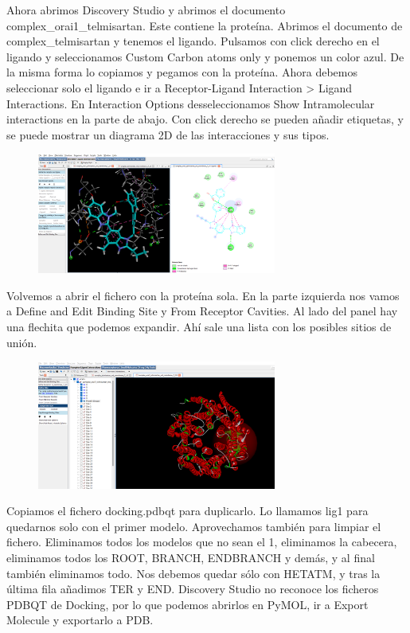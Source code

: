 Ahora abrimos Discovery Studio y abrimos el documento complex\_orai1\_telmisartan. Este contiene la proteína. Abrimos el documento de complex\_telmisartan y tenemos el ligando. Pulsamos con click derecho en el ligando y seleccionamos Custom Carbon atoms only y ponemos un color azul. De la misma forma lo copiamos y pegamos con la proteína. Ahora debemos seleccionar solo el ligando e ir a Receptor-Ligand Interaction > Ligand Interactions. En Interaction Options desseleccionamos Show Intramolecular interactions en la parte de abajo. Con click derecho se pueden añadir etiquetas, y se puede mostrar un diagrama 2D de las interacciones y sus tipos.

\begin{figure}[h]
\centering
\includegraphics[width = 0.7\textwidth]{figs/2d-diagram-docking.png}
\end{figure}

Volvemos a abrir el fichero con la proteína sola. En la parte izquierda nos vamos a Define and Edit Binding Site y From Receptor Cavities. Al lado del panel hay una flechita que podemos expandir. Ahí sale una lista con los posibles sitios de unión. 

\begin{figure}[h]
\centering
\includegraphics[width = 0.7\textwidth]{figs/binding-sites.png}
\end{figure}

Copiamos el fichero docking.pdbqt para duplicarlo. Lo llamamos lig1 para quedarnos solo con el primer modelo. Aprovechamos también para limpiar el fichero. Eliminamos todos los modelos que no sean el 1, eliminamos la cabecera, eliminamos todos los ROOT, BRANCH, ENDBRANCH y demás, y al final también eliminamos todo. Nos debemos quedar sólo con HETATM, y tras la última fila añadimos TER y END. Discovery Studio no reconoce los ficheros PDBQT de Docking, por lo que podemos abrirlos en PyMOL, ir a Export Molecule y exportarlo a PDB.